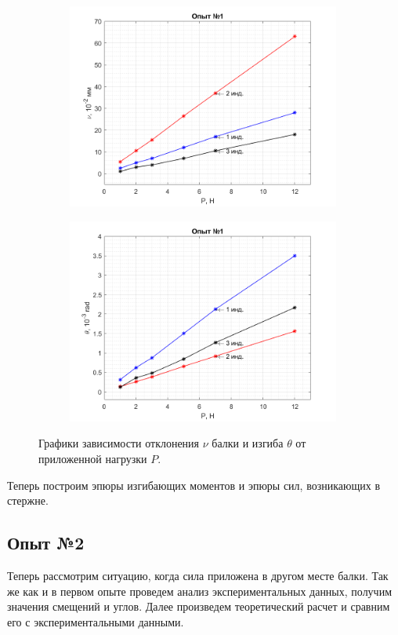 \documentclass[12pt, a4paper]{article}
\begin{document}
    \begin{figure}[h!]
        \centering
        \hspace{-2cm}
        \begin{subfigure}{0.4\textwidth}
            \centering
            \includegraphics[width = 9cm]{figure_1.png}
        \end{subfigure}
        \hspace{1cm}
        \begin{subfigure}{0.4\textwidth}
            \centering
            \includegraphics[width = 9cm]{figure_2.png}
        \end{subfigure}
        \caption{\centering Графики зависимости отклонения $\nu$ балки и изгиба $\theta$ от приложенной нагрузки $P$.}
        \label{fig1}
    \end{figure}
    
    Теперь построим эпюры изгибающих моментов и эпюры сил, возникающих в стержне. 
    
    \subsection{Опыт №2}
    
    Теперь рассмотрим ситуацию, когда сила приложена в другом месте балки. Так же как и в первом опыте проведем анализ экспериментальных данных, получим значения смещений и углов. Далее произведем теоретический расчет и сравним его с экспериментальными данными.
    
\end{document}
